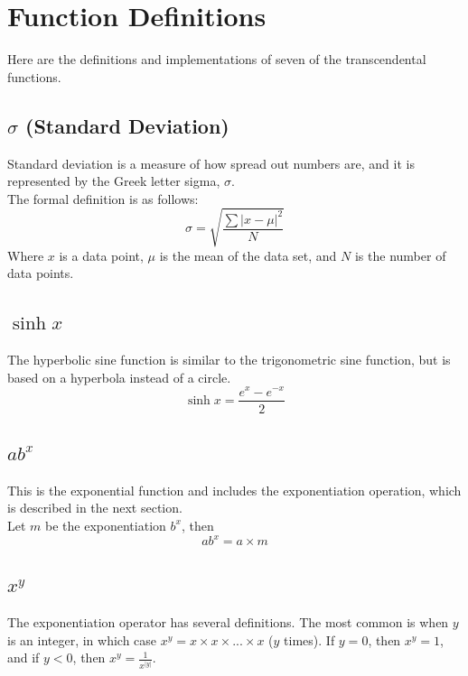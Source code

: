 \documentclass[11pt,onside]{report}
\begin{document}
\section{Function Definitions}
Here are the definitions and implementations of seven of the transcendental functions.

\subsection{$\sigma$ (Standard Deviation)}
    Standard deviation is a measure of how spread out numbers are, and it is represented by the Greek letter sigma, $\sigma$. \\
    The formal definition is as follows:
\begin{equation}
    \sigma = \sqrt{\frac{\sum |x-\mu|^2}{N}}
\end{equation}
Where $x$ is a data point, $\mu$ is the mean of the data set, and $N$ is the number of data points. \cite{standard_deviation}

\subsection{$\sinh{x}$}
The hyperbolic sine function is similar to the trigonometric sine function, but is based on a hyperbola instead of a circle. \cite{sinh}
\begin{equation}
    \sinh{x} = \frac{e^x-e^{-x}}{2}
\end{equation}

\subsection{$ab^x$}
This is the exponential function and includes the exponentiation operation, which is described in the next section. \\
Let $m$ be the exponentiation $b^x$, then
\begin{equation}
    ab^x = a\times m
\end{equation}

\subsection{$x^y$}
The exponentiation operator has several definitions. The most common is when $y$ is an integer, in which case $x^y = x \times x \times ... \times x$ ($y$ times). If $y = 0$, then $x^y = 1$, and if $y < 0$, then $x^y = \frac{1}{x^{|y|}}$. \cite{exponents}\\
\end{document}
